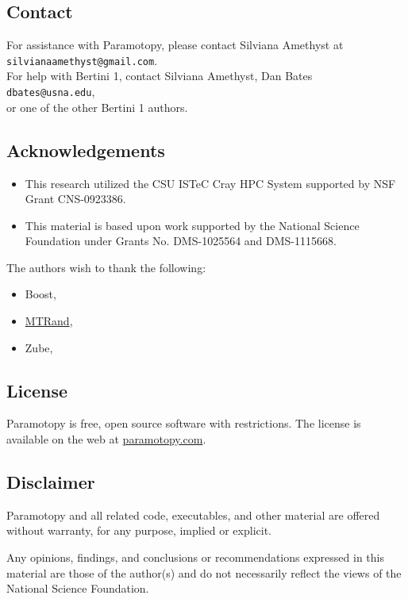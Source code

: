 \subsection{Contact}
\label{sec:contact}
For assistance with Paramotopy, please contact Silviana Amethyst at \\
\texttt{silvianaamethyst@gmail.com}.  \\For help with Bertini 1, contact Silviana Amethyst, Dan Bates \\
\texttt{dbates@usna.edu}, \\or one of the other Bertini 1 authors.

\subsection*{Acknowledgements}
\begin{itemize}
\item  This research utilized the CSU ISTeC Cray HPC System supported by NSF Grant CNS-0923386.
\item  This material is based upon work supported by the National Science Foundation under Grants No. DMS-1025564 and DMS-1115668.
\end{itemize}

The authors wish to thank the following:
\begin{itemize}
	\item Boost,
	\item \href{http://www.bedaux.net/mtrand/}{MTRand},
	\item Zube,
\end{itemize}

\clearpage
\subsection{License}
\label{sec:license}
Paramotopy is free, open source software with restrictions.  The license is available on the web at \href{http://www.paramotopy.com/resources/programs/paramotopy_license.txt}{paramotopy.com}.

\subsection*{Disclaimer}
Paramotopy and all related code, executables, and other material are offered without warranty, for any purpose, implied or explicit. 

Any opinions, findings, and conclusions or recommendations expressed in this material are those of the author(s) and do not necessarily reflect the views of the National Science Foundation.




